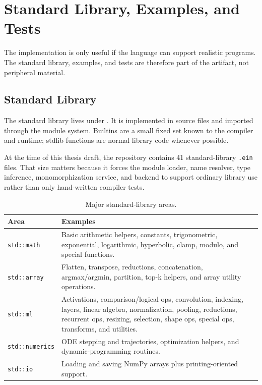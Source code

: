 \chapter{Standard Library, Examples, and Tests}

The implementation is only useful if the language can support realistic
programs. The standard library, examples, and tests are therefore part of the
artifact, not peripheral material.

\section{Standard Library}

The standard library lives under . It is implemented in
\einlang{} source files and imported through the module system. Builtins are a
small fixed set known to the compiler and runtime; stdlib functions are normal
library code whenever possible.

At the time of this thesis draft, the repository contains 41 standard-library
\texttt{.ein} files. That size matters because it forces the module loader,
name resolver, type inference, monomorphization service, and backend to support
ordinary library use rather than only hand-written compiler tests.

\begin{table}[htbp]
\centering
\caption{Major standard-library areas.}
\label{tab:stdlib}
\renewcommand{\arraystretch}{1.08}
\begin{tabular}{@{}L{0.28\textwidth}L{0.60\textwidth}@{}}
\toprule
Area & Examples \\
\midrule
\texttt{std::math} & Basic arithmetic helpers, constants, trigonometric, exponential, logarithmic, hyperbolic, clamp, modulo, and special functions. \\
\texttt{std::array} & Flatten, transpose, reductions, concatenation, argmax/argmin, partition, top-k helpers, and array utility operations. \\
\texttt{std::ml} & Activations, comparison/logical ops, convolution, indexing, layers, linear algebra, normalization, pooling, reductions, recurrent ops, resizing, selection, shape ops, special ops, transforms, and utilities. \\
\texttt{std::numerics} & ODE stepping and trajectories, optimization helpers, and dynamic-programming routines. \\
\texttt{std::io} & Loading and saving NumPy arrays plus printing-oriented support. \\
\bottomrule
\end{tabular}
\end{table}


